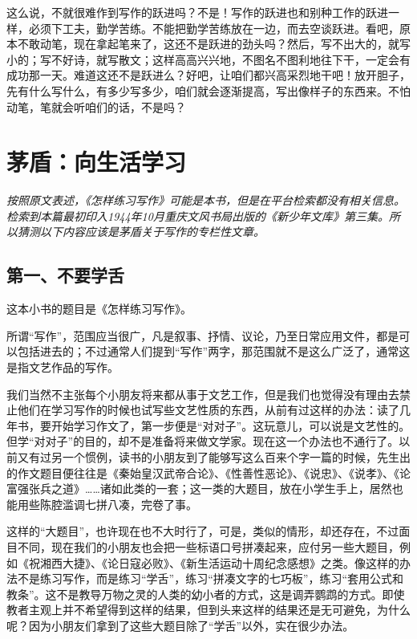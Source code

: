 \documentclass[12pt,a5paper]{ctexbook}
\begin{document}
这么说，不就很难作到写作的跃进吗？不是！写作的跃进也和别种工作的跃进一样，必须下工夫，勤学苦练。不能把勤学苦练放在一边，而去空谈跃进。看吧，原本不敢动笔，现在拿起笔来了，这还不是跃进的劲头吗？然后，写不出大的，就写小的；写不好诗，就写散文；这样高高兴兴地，不图名不图利地往下干，一定会有成功那一天。难道这还不是跃进么？好吧，让咱们都兴高采烈地干吧！放开胆子，先有什么写什么，有多少写多少，咱们就会逐渐提高，写出像样子的东西来。不怕动笔，笔就会听咱们的话，不是吗？

\newpage

\section{茅盾：向生活学习}

\emph{按照原文表述，《怎样练习写作》可能是本书，但是在平台检索都没有相关信息。检索到本篇最初印入1944年10月重庆文风书局出版的《新少年文库》第三集。所以猜测以下内容应该是茅盾关于写作的专栏性文章。}
\vspace{2em}

\subsection{第一、不要学舌}
这本小书的题目是《怎样练习写作》。

所谓“写作”，范围应当很广，凡是叙事、抒情、议论，乃至日常应用文件，都是可以包括进去的；不过通常人们提到“写作”两字，那范围就不是这么广泛了，通常这是指文艺作品的写作。

我们当然不主张每个小朋友将来都从事于文艺工作，但是我们也觉得没有理由去禁止他们在学习写作的时候也试写些文艺性质的东西，从前有过这样的办法：读了几年书，要开始学习作文了，第一步便是“对对子”。这玩意儿，可以说是文艺性的。但学“对对子”的目的，却不是准备将来做文学家。现在这一个办法也不通行了。以前又有过另一个惯例，读书的小朋友到了能够写这么百来个字一篇的时候，先生出的作文题目便往往是《秦始皇汉武帝合论》、《性善性恶论》、《说忠》、《说孝》、《论富强张兵之道》……诸如此类的一套；这一类的大题目，放在小学生手上，居然也能用些陈腔滥调七拼八凑，完卷了事。

这样的“大题目”，也许现在也不大时行了，可是，类似的情形，却还存在，不过面目不同，现在我们的小朋友也会把一些标语口号拼凑起来，应付另一些大题目，例如《祝湘西大捷》、《论日寇必败》、《新生活运动十周纪念感想》之类。像这样的办法不是练习写作，而是练习“学舌”，练习“拼凑文字的七巧板”，练习“套用公式和教条”。这不是教导万物之灵的人类的幼小者的方式，这是调弄鹦鹉的方式。即使教者主观上并不希望得到这样的结果，但到头来这样的结果还是无可避免，为什么呢？因为小朋友们拿到了这些大题目除了“学舌”以外，实在很少办法。
\end{document}
